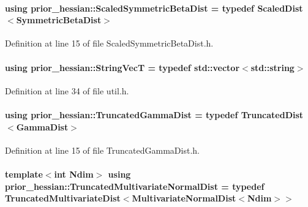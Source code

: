 \paragraph[{\texorpdfstring{Scaled\+Symmetric\+Beta\+Dist}{ScaledSymmetricBetaDist}}]{\setlength{\rightskip}{0pt plus 5cm}using {\bf prior\+\_\+hessian\+::\+Scaled\+Symmetric\+Beta\+Dist} = typedef {\bf Scaled\+Dist}$<${\bf Symmetric\+Beta\+Dist}$>$}\hypertarget{namespaceprior__hessian_ae84776b8f8ed86c14a5ce47a29b7a1be}{}\label{namespaceprior__hessian_ae84776b8f8ed86c14a5ce47a29b7a1be}


Definition at line 15 of file Scaled\+Symmetric\+Beta\+Dist.\+h.

\paragraph[{\texorpdfstring{String\+VecT}{StringVecT}}]{\setlength{\rightskip}{0pt plus 5cm}using {\bf prior\+\_\+hessian\+::\+String\+VecT} = typedef std\+::vector$<$std\+::string$>$}\hypertarget{namespaceprior__hessian_a61fc0176249462ee94fe3cca92cf3f8c}{}\label{namespaceprior__hessian_a61fc0176249462ee94fe3cca92cf3f8c}


Definition at line 34 of file util.\+h.

\paragraph[{\texorpdfstring{Truncated\+Gamma\+Dist}{TruncatedGammaDist}}]{\setlength{\rightskip}{0pt plus 5cm}using {\bf prior\+\_\+hessian\+::\+Truncated\+Gamma\+Dist} = typedef {\bf Truncated\+Dist}$<${\bf Gamma\+Dist}$>$}\hypertarget{namespaceprior__hessian_acd158ecf6698fbe5a4430df7730d3aba}{}\label{namespaceprior__hessian_acd158ecf6698fbe5a4430df7730d3aba}


Definition at line 15 of file Truncated\+Gamma\+Dist.\+h.

\paragraph[{\texorpdfstring{Truncated\+Multivariate\+Normal\+Dist}{TruncatedMultivariateNormalDist}}]{\setlength{\rightskip}{0pt plus 5cm}template$<$int Ndim$>$ using {\bf prior\+\_\+hessian\+::\+Truncated\+Multivariate\+Normal\+Dist} = typedef {\bf Truncated\+Multivariate\+Dist}$<${\bf Multivariate\+Normal\+Dist}$<$Ndim$>$$>$}\hypertarget{namespaceprior__hessian_a99ef03c8a3e476931d451d6d944ffae5}{}\label{namespaceprior__hessian_a99ef03c8a3e476931d451d6d944ffae5}


